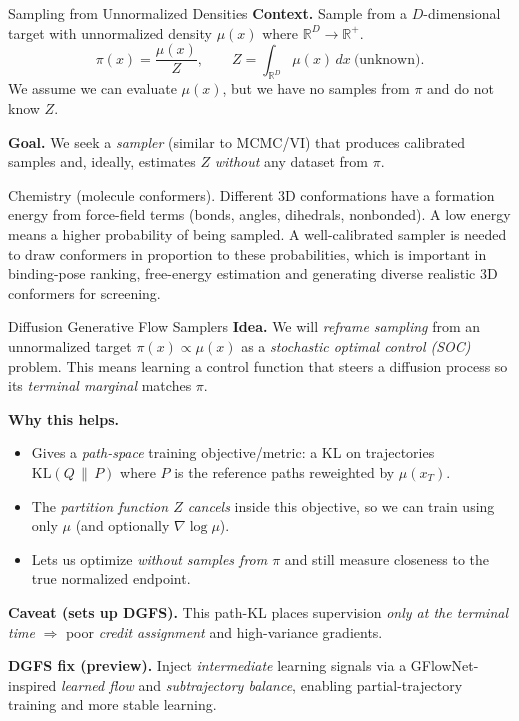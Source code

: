 \documentclass[aspectratio=169,xcolor=dvipsnames]{beamer}
\begin{document}
\begin{frame}[t]{Sampling from Unnormalized Densities}
\footnotesize
\textbf{Context.} Sample from a $D$-dimensional target with unnormalized density $\mu(x)$ where $\mathbb R^D \to \mathbb R^+$.
\[
\pi(x)=\frac{\mu(x)}{Z},\qquad Z=\int_{\mathbb R^D}\mu(x)\,dx\ \text{(unknown)}.
\]
We assume we can evaluate $\mu(x)$, but we have no samples from $\pi$ and do not know $Z$.

\vspace{0.1cm}

\medskip
\textbf{Goal.} We seek a \emph{sampler} (similar to MCMC/VI) that produces calibrated samples and, ideally, estimates $Z$ \emph{without} any dataset from $\pi$.

\vspace{0.3cm}

\begin{block}{\scriptsize Chemistry (molecule conformers).} \scriptsize Different 3D conformations have a formation energy from force-field terms (bonds, angles, dihedrals, nonbonded). A low energy means a higher probability of being sampled. A well-calibrated sampler is needed to draw conformers in proportion to these probabilities, which is important in binding-pose ranking, free-energy estimation and generating diverse realistic 3D conformers for screening.
\end{block}

\end{frame}

\begin{frame}[t]{Diffusion Generative Flow Samplers}
\footnotesize
\textbf{Idea.} We will \emph{reframe sampling} from an unnormalized target $\pi(x)\propto \mu(x)$ as a \emph{stochastic optimal control (SOC)} problem. This means learning a control function that steers a diffusion process so its \emph{terminal marginal} matches $\pi$.

\medskip
\textbf{Why this helps.}
\begin{itemize}\itemsep2pt
  \item Gives a \emph{path-space} training objective/metric: a KL on trajectories $\mathrm{KL}(Q\,\|\,P)$ where $P$ is the reference paths reweighted by $\mu(x_T)$.
  \item The \emph{partition function $Z$ cancels} inside this objective, so we can train using only $\mu$ (and optionally $\nabla\log\mu$).
  \item Lets us optimize \emph{without samples from $\pi$} and still measure closeness to the true normalized endpoint.
\end{itemize}

\medskip
\textbf{Caveat (sets up DGFS).} This path-KL places supervision \emph{only at the terminal time} $\Rightarrow$ poor \emph{credit assignment} and high-variance gradients.

\medskip
\textbf{DGFS fix (preview).} Inject \emph{intermediate} learning signals via a GFlowNet-inspired \emph{learned flow} and \emph{subtrajectory balance}, enabling partial-trajectory training and more stable learning.
\end{frame}
\end{document}
